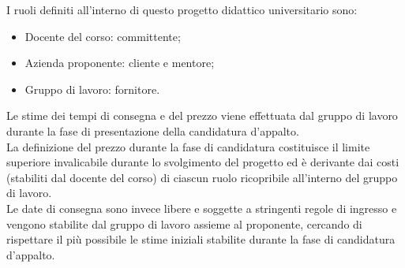\documentclass[10pt, a4paper]{article}
\begin{document}
I ruoli definiti all'interno di questo progetto didattico universitario sono:
\begin{itemize}
    \item Docente del corso: committente;
    \item Azienda proponente: cliente e mentore;
    \item Gruppo di lavoro: fornitore. 
\end{itemize}
Le stime dei tempi di consegna e del prezzo viene effettuata dal gruppo di lavoro durante la fase di presentazione della 
candidatura d'appalto.\\
La definizione del prezzo durante la fase di candidatura costituisce il limite superiore invalicabile durante lo svolgimento del progetto ed
è derivante dai costi (stabiliti dal docente del corso) di ciascun ruolo ricopribile all'interno del gruppo di lavoro.\\
Le date di consegna sono invece libere e soggette a stringenti regole di ingresso e vengono stabilite dal gruppo di lavoro assieme al proponente,
cercando di rispettare il più possibile le stime iniziali stabilite durante la fase di candidatura d'appalto.
\end{document}
